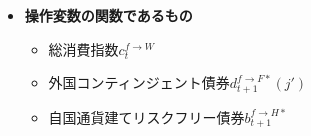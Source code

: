 \begin{itemize}
        マクロの総需要から決定される自身の生産\(y_t^f\)やそれに伴う労働\(l_t^f\)、
        自身の財の価格\(p_t^{f*}\)についても、家計としての計算においてはすべて所与（定数）として扱う。
    \item
    \label{itm:household_optimization_foreign_calculation_remark2}
        \textbf{操作変数の関数であるもの}
        \begin{itemize}
            \item 総消費指数\(c_t^{f\to W}\)
            \item 外国コンティンジェント債券\(d_{t+1}^{f\to F*}(j')\)
            \item 自国通貨建てリスクフリー債券\(b_{t+1}^{f\to H*}\)
        \end{itemize}
\end{itemize}